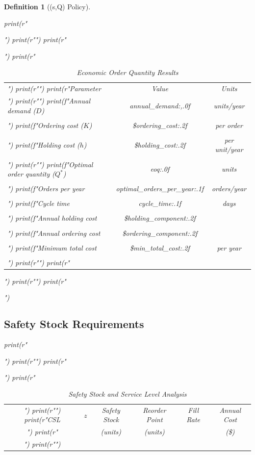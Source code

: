 \documentclass[a4paper, 11pt]{article}
\newtheorem{definition}{Definition}[section]
\begin{document}
\begin{definition}[(s,Q) Policy]
\begin{pycode}
print(r"\begin{table}[htbp]")
print(r"\centering")
print(r"\caption{Economic Order Quantity Results}")
print(r"\begin{tabular}{lcc}")
print(r"\toprule")
print(r"Parameter & Value & Units \\")
print(r"\midrule")
print(f"Annual demand ($D$) & {annual_demand:,.0f} & units/year \\\\")
print(f"Ordering cost ($K$) & \${ordering_cost:.2f} & per order \\\\")
print(f"Holding cost ($h$) & \${holding_cost:.2f} & per unit/year \\\\")
print(r"\midrule")
print(f"Optimal order quantity ($Q^*$) & {eoq:.0f} & units \\\\")
print(f"Orders per year & {optimal_orders_per_year:.1f} & orders/year \\\\")
print(f"Cycle time & {cycle_time:.1f} & days \\\\")
print(f"Annual holding cost & \${holding_component:.2f} & \\\\")
print(f"Annual ordering cost & \${ordering_component:.2f} & \\\\")
print(f"Minimum total cost & \${min_total_cost:.2f} & per year \\\\")
print(r"\bottomrule")
print(r"\end{tabular}")
print(r"\label{tab:eoq}")
print(r"\end{table}")
\end{pycode}

\subsection{Safety Stock Requirements}

\begin{pycode}
print(r"\begin{table}[htbp]")
print(r"\centering")
print(r"\caption{Safety Stock and Service Level Analysis}")
print(r"\begin{tabular}{cccccc}")
print(r"\toprule")
print(r"CSL & $z$ & Safety Stock & Reorder Point & Fill Rate & Annual Cost \\")
print(r" & & (units) & (units) & & (\$) \\")
print(r"\midrule")


\end{tabular}
\end{table}
\end{pycode}
\end{definition}
\end{document}
